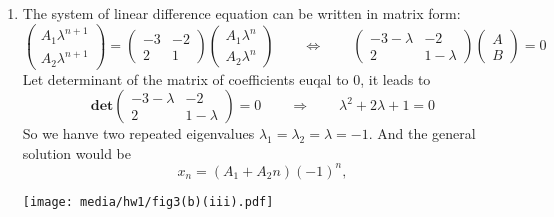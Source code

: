 \documentclass[
    classnum=MATH564,
    classname=MATHEMATICAL\ MODELING,
    due=January\ 28\,\ 2020,
    author=Gabrielle\ Streeter\qquad Hannah\ Wu\qquad\ Minghang\ Li,
    authorshort=Streeter\ \&\ Wu\ \&\ Li,
    teacher= Zachary\ M.\ Boyd,
    hw=1
]{hw-template}
\newenvironment{Figure}
  {\par\medskip\noindent\minipage{\linewidth}}
  {\endminipage\par\medskip}
\begin{document}
\begin{homeworkProblem}
\begin{enumerate}
\begin{enumerate}[label=(\roman*)]
        \item The system of linear difference equation can be written in matrix form: \[
            \left(\begin{matrix}A_1\lambda^{n+1}\\ A_2\lambda^{n+1}\end{matrix}\right)
            = \left(\begin{matrix}
                -3 & -2 \\
                 2 &  1
            \end{matrix}\right)
            \left(\begin{matrix}A_1\lambda^n \\ A_2 \lambda^n \end{matrix}\right)
        \qquad \Leftrightarrow \qquad
            \left(\begin{matrix}
                -3-\lambda & -2 \\
                 2 &  1-\lambda
            \end{matrix}\right) \left(\begin{matrix}A\\B\end{matrix}\right)
            = 0
        \]
        Let determinant of the matrix of coefficients euqal to $0$, it leads to \[
            \mathbf{det}\left(\begin{matrix}
                -3-\lambda & -2 \\
                 2 &  1-\lambda
            \end{matrix}\right) = 0 \qquad \Rightarrow \qquad
            \lambda^2 + 2\lambda + 1 = 0
        \]
        So we hanve two repeated eigenvalues $\lambda_1 = \lambda_2 = \lambda = -1$. And the
        general solution would be \[
            x_n = (A_1 + A_2 n) (-1)^n,
        \]
        \begin{Figure}
            \centering
            \texttt{[image: media/hw1/fig3(b)(iii).pdf]}
        \end{Figure}
    \end{enumerate}
\end{enumerate}
\end{homeworkProblem}

\pagebreak
\end{document}

